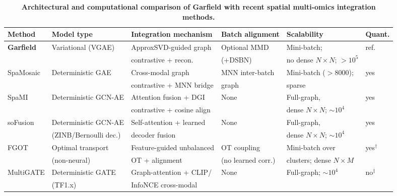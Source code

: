 \begin{table}[ht]
\centering
\caption{\textbf{Architectural and computational comparison of Garfield with recent spatial multi-omics integration methods.} }
\label{tab:recent_arch}
\footnotesize
\setlength{\tabcolsep}{4pt}
\begin{tabular}{@{}llllll@{}}
\toprule
\textbf{Method} & \textbf{Model type} & \textbf{Integration mechanism} & \textbf{Batch alignment} & \textbf{Scalability} & \textbf{Quant.} \\
\midrule
\textbf{Garfield} & Variational (VGAE) & ApproxSVD-guided graph & Optional MMD & Mini-batch; & ref. \\
 & & contrastive + recon. & (+DSBN) & no dense $N{\times}N$; $>$$10^5$ & \\
SpaMosaic & Deterministic GAE & Cross-modal graph & MNN inter-batch & Mini-batch ($>$8000); & yes \\
 & & contrastive + MNN bridge & graph & sparse & \\
SpaMI & Deterministic GCN-AE & Attention fusion + DGI & None & Full-graph, & yes \\
 & & contrastive + cosine align & & dense $N{\times}N$; $\sim$$10^4$ & \\
soFusion & Deterministic GCN-AE & Self-attention + learned & None & Full-graph, & yes \\
 & (ZINB/Bernoulli dec.) & decoder fusion & & dense $N{\times}N$; $\sim$$10^4$ & \\
FGOT & Optimal transport & Feature-guided unbalanced & OT coupling & Mini-batch over & yes$^{\dagger}$ \\
 & (non-neural) & OT + alignment & (no learned corr.) & clusters; dense $N{\times}M$ & \\
MultiGATE & Deterministic GATE & Graph-attention + CLIP/ & None & Full-graph; $\sim$$10^4$ & no$^{\ddagger}$ \\
 & (TF1.x) & InfoNCE cross-modal & & & \\

\end{tabular}
\end{table}

